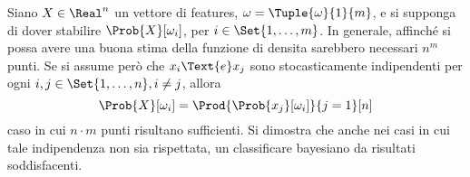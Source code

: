 \documentclass{subfiles}
\begin{document}
Siano \(X \in \Real^{n}\) un vettore di features, \(\omega = \Tuple{\omega}{1}{m}\), e si supponga di dover stabilire \(\Prob{X}[\omega_{i}]\),
per \(i \in \Set{1, \ldots, m}\). In generale, affinché si possa avere una buona stima della funzione di densita sarebbero necessari \(n^{m}\) punti.
Se si assume però che \(x_{i} \Text{e} x_{j}\) sono stocasticamente indipendenti per ogni \(i, j \in \Set{1, \ldots, n}, i \ne j\), allora
\[
    \Prob{X}[\omega_{i}] = \Prod{\Prob{x_{j}}[\omega_{i}]}{j = 1}[n]
\]
caso in cui \(n \cdot m\) punti risultano sufficienti.
Si dimostra che anche nei casi in cui tale indipendenza non sia rispettata, un classificare bayesiano da risultati soddisfacenti.
\end{document}
